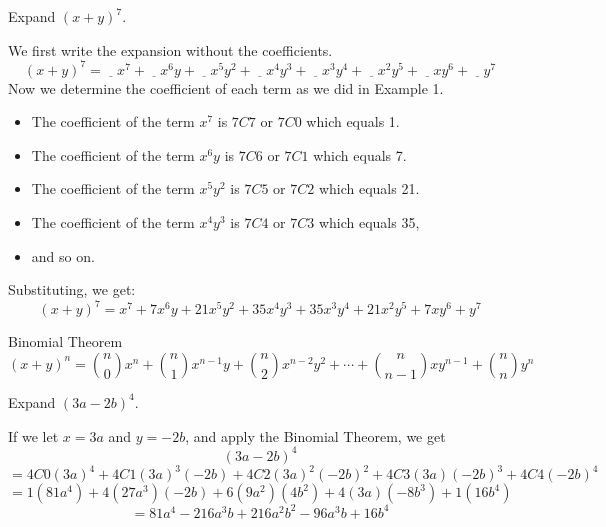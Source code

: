 \begin{example}
    Expand \( (x + y)^7 \).
\end{example}
\begin{solution}
    We first write the expansion without the coefficients.
    \[ (x+y)^7 = \underline{~~~~}x^7 + \underline{~~~~}x^6y + \underline{~~~~}x^5y^2 + \underline{~~~~}x^4y^3 + \underline{~~~~}x^3y^4 + \underline{~~~~}x^2y^5 + \underline{~~~~}xy^6 + \underline{~~~~}y^7
    \]
    Now we determine the coefficient of each term as we did in Example 1.
    \begin{itemize}
        \item The coefficient of the term \( x^7 \) is \( 7C7 \) or \( 7C0 \) which equals 1.
        \item The coefficient of the term \( x^6y \) is \( 7C6 \) or \( 7C1 \) which equals 7.
        \item The coefficient of the term \( x^5y^2 \) is \( 7C5 \) or \( 7C2 \) which equals 21.
        \item The coefficient of the term \( x^4y^3 \) is \( 7C4 \) or \( 7C3 \) which equals 35,
        \item and so on.
    \end{itemize}
    Substituting, we get:
    \[ (x+y)^7 = x^7+7x^6y+21x^5y^2+35x^4y^3+35x^3y^4+21x^2y^5+7xy^6+y^7 \]
\end{solution}

\begin{summarybox}{Binomial Theorem}
    \[
        (x + y)^n = \binom{n}{0}x^n + \binom{n}{1}x^{n-1}y + \binom{n}{2}x^{n-2}y^2 + \cdots + \binom{n}{n-1}xy^{n-1} + \binom{n}{n}y^n
    \]
\end{summarybox}

\begin{example}
    Expand \( (3a-2b)^4 \).
\end{example}
\begin{solution}
    If we let \( x = 3a \) and \( y = -2b \), and apply the Binomial Theorem, we get
    \[(3a-2b)^4\]
    \[
        = 4C0(3a)^4 + 4C1(3a)^3(-2b) + 4C2(3a)^2(-2b)^2 + 4C3(3a)(-2b)^3 + 4C4(-2b)^4
    \]
    \[
        = 1(81a^4) + 4(27a^3)(-2b) + 6(9a^2)(4b^2) + 4(3a)(-8b^3) + 1(16b^4)
    \]
    \[
        = 81a^4 - 216a^3b + 216a^2b^2 - 96a^3b + 16b^4
    \]
\end{solution}

